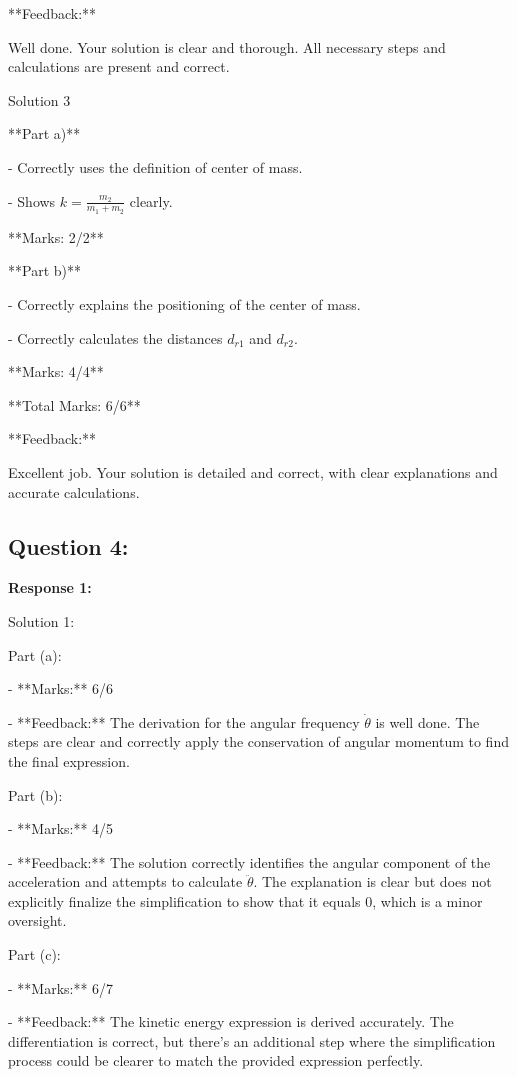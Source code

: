 \documentclass[a4paper,11pt]{article}
\begin{document}
**Feedback:**

Well done. Your solution is clear and thorough. All necessary steps and calculations are present and correct.

Solution 3

**Part a)**

- Correctly uses the definition of center of mass.

- Shows \( k = \frac{m_2}{m_1 + m_2} \) clearly.

**Marks: 2/2**

**Part b)**

- Correctly explains the positioning of the center of mass.

- Correctly calculates the distances \( d_{r1} \) and \( d_{r2} \).

**Marks: 4/4**

**Total Marks: 6/6**

**Feedback:**

Excellent job. Your solution is detailed and correct, with clear explanations and accurate calculations.

\subsection*{Question 4:}

\textbf{Response 1:}

Solution 1:

Part (a):

- **Marks:** 6/6

- **Feedback:** The derivation for the angular frequency \(\dot{\theta}\) is well done. The steps are clear and correctly apply the conservation of angular momentum to find the final expression.

Part (b):

- **Marks:** 4/5

- **Feedback:** The solution correctly identifies the angular component of the acceleration and attempts to calculate \(\ddot{\theta}\). The explanation is clear but does not explicitly finalize the simplification to show that it equals 0, which is a minor oversight.

Part (c):

- **Marks:** 6/7

- **Feedback:** The kinetic energy expression is derived accurately. The differentiation is correct, but there's an additional step where the simplification process could be clearer to match the provided expression perfectly.
\end{document}
